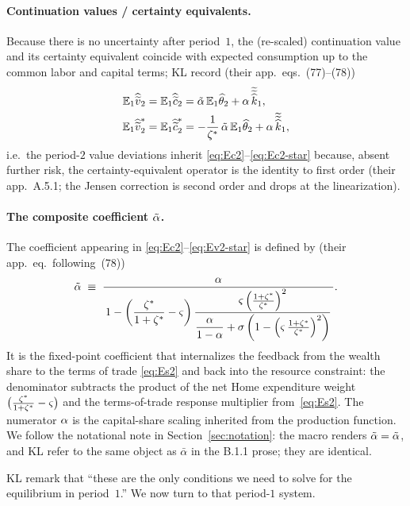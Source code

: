 \paragraph{Continuation values / certainty equivalents.} Because there is no
uncertainty after period~$1$, the (re-scaled) continuation value and its
certainty equivalent coincide with expected consumption up to the common labor
and capital terms; KL record (their app.~eqs.~(77)--(78))
\begin{align}
\mathbb{E}_1\widehat{\widetilde{v}}_2 &= \mathbb{E}_1\widehat{\widetilde{c}}_2 = \tilde{\alpha}\,\mathbb{E}_1\widehat{\theta}_2 + \alpha\,\widetilde{\widetilde{\widehat{k}}}_1, \label{eq:Ev2}\\
\mathbb{E}_1\widehat{\widetilde{v}}^{*}_2 &= \mathbb{E}_1\widehat{\widetilde{c}}^{*}_2 = -\frac{1}{\zeta^{*}}\,\tilde{\alpha}\,\mathbb{E}_1\widehat{\theta}_2 + \alpha\,\widetilde{\widetilde{\widehat{k}}}_1, \label{eq:Ev2-star}
\end{align}
i.e.\ the period-$2$ value deviations inherit \eqref{eq:Ec2}--\eqref{eq:Ec2-star}
because, absent further risk, the certainty-equivalent operator is the identity
to first order (their app.~A.5.1; the Jensen correction is second order and
drops at the linearization).

\paragraph{The composite coefficient $\tilde{\alpha}$.} The coefficient appearing in
\eqref{eq:Ec2}--\eqref{eq:Ev2-star} is defined by (their app.~eq.\ following~(78))
\begin{equation}
\tilde{\alpha} \;\equiv\; \frac{\alpha}{\,1-\left(\dfrac{\zeta^{*}}{1+\zeta^{*}}-\varsigma\right)
\dfrac{\varsigma\left(\frac{1+\zeta^{*}}{\zeta^{*}}\right)^2}
{\dfrac{\alpha}{1-\alpha}+\sigma\left(1-\left(\varsigma\,\frac{1+\zeta^{*}}{\zeta^{*}}\right)^2\right)}\,}. \label{eq:atil-def}
\end{equation}
It is the fixed-point coefficient that internalizes the feedback from the wealth
share to the terms of trade \eqref{eq:Es2} and back into the resource
constraint: the denominator subtracts the product of the net Home expenditure
weight $\bigl(\frac{\zeta^{*}}{1+\zeta^{*}}-\varsigma\bigr)$ and the terms-of-trade response
multiplier from~\eqref{eq:Es2}. The numerator $\alpha$ is the capital-share
scaling inherited from the production function. We follow the notational note in
Section~\ref{sec:notation}: the macro renders $\tilde{\alpha}=\tilde\alpha$, and KL refer
to the same object as $\bar\alpha$ in the B.1.1 prose; they are identical.

\medskip
KL remark that ``these are the only conditions we need to solve for the
equilibrium in period~$1$.'' We now turn to that period-$1$ system.

